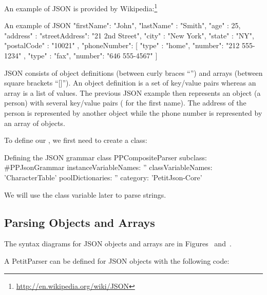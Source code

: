 \documentclass[a4paper,10pt,twoside]{book}
\begin{document}
An example of JSON is provided by
Wikipedia:\footnote{\url{http://en.wikipedia.org/wiki/JSON}}

\begin{script}{An example of JSON}
{
  "firstName": "John",
  "lastName" : "Smith",
  "age"      : 25,
  "address"  :
  {
    "streetAddress": "21 2nd Street",
    "city"         : "New York",
    "state"        : "NY",
    "postalCode"   : "10021"
  },
  "phoneNumber":
  [
    {
      "type"  : "home",
      "number": "212 555-1234"
    },
    {
      "type"  : "fax",
      "number": "646 555-4567"
    }
  ]
}
\end{script}

JSON consists of object definitions (between curly braces ``{}'') and
arrays (between square brackets ``[]''). An object definition is a set
of key/value pairs whereas an array is a list of values. The previous
JSON example then represents an object (a person) with several
key/value pairs (\eg{} for the first name). The address of the person
is represented by another object while the phone number is represented
by an array of objects.

To define our , we first need to create a class:

\begin{script}{Defining the JSON grammar class}
PPCompositeParser subclass: #PPJsonGrammar
  instanceVariableNames: ''
  classVariableNames: 'CharacterTable'
  poolDictionaries: ''
  category: 'PetitJson-Core'
\end{script}

We will use the  class variable later to parse
strings.

\subsection{Parsing Objects and Arrays}

The syntax diagrams for JSON objects and arrays are in
Figures~ and~.

A PetitParser can be defined for JSON objects with the following code:

\end{document}
